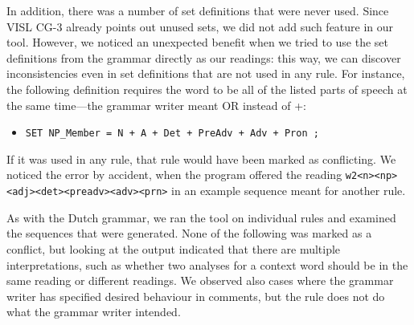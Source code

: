 In addition, there was a number of set definitions that were never
used. Since VISL CG-3 already points out unused sets, we did not add such
feature in our tool. However, we noticed an unexpected benefit when
we tried to use the set definitions from the grammar directly as our
readings: this way, we can discover inconsistencies even in
set definitions that are not used in any rule.
For instance, the following definition requires the word to be all of
the listed parts of speech at the same time---the grammar writer meant
OR instead of +:
\begin{itemize}
\item[] 
\texttt{SET NP\_Member = N + A + Det + PreAdv + Adv + Pron ;}
\end{itemize}

If it was used in any rule, that rule would have been marked as
conflicting. We noticed the error by accident, when the program
offered the reading \texttt{w2<n><np><adj><det><preadv><adv><prn>}
in an example sequence meant for another rule.


As with the Dutch grammar, we ran the tool on individual rules and
examined the sequences that were generated. None of the following was
marked as a conflict, but looking at the output indicated that there
are multiple interpretations, such as whether two analyses for a
context word should be in the same reading or different readings.
We observed also cases where the grammar writer has specified desired
behaviour in comments, but the rule does not do what the grammar
writer intended. 




